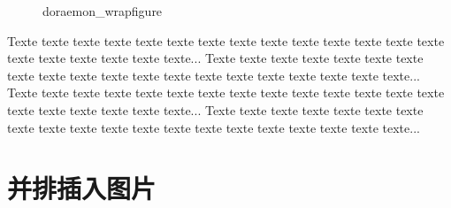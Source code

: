\documentclass{article}
\begin{document}
    \begin{figure}%
        \centering
        \caption{doraemon\_wrapfigure}
    \end{figure}

    Texte texte texte texte texte texte texte
    texte texte texte texte texte texte texte
    texte texte texte texte texte texte...
    Texte texte texte texte texte texte texte
    texte texte texte texte texte texte texte
    texte texte texte texte texte texte...
    Texte texte texte texte texte texte texte
    texte texte texte texte texte texte texte
    texte texte texte texte texte texte...
    Texte texte texte texte texte texte texte
    texte texte texte texte texte texte texte
    texte texte texte texte texte texte...

\section{并排插入图片}
\end{document}
